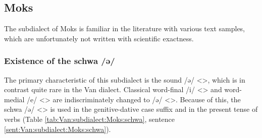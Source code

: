 \subsection{Moks}

The subdialect of Moks is familiar in the literature with various text samples, which are unfortunately not written with scientific exactness. 


\begin{adjarianpage}\label{page:147}\end{adjarianpage}%

\subsubsection{Existence of the schwa /ə/}
The primary characteristic of this subdialect is the sound /ə/ <>, which is in contrast quite rare in the Van dialect. Classical word-final /i/ <> and word-medial /e/ <> are indiscriminately changed to /ə/ <>. Because of this, the schwa /ə/ <> is used in the genitive-dative case suffix and in the present tense of verbs (Table \ref{tab:Van:subdialect:Moks:schwa}, sentence \ref{sent:Van:subdialect:Moks:schwa}).

\begin{table}[H]
	\centering
	\caption{Change from Classical Armenian /i, e/ <> to /ə/ <> in the Moks subdialect of the Van dialect}
	\label{tab:Van:subdialect:Moks:schwa}
\end{table} 

